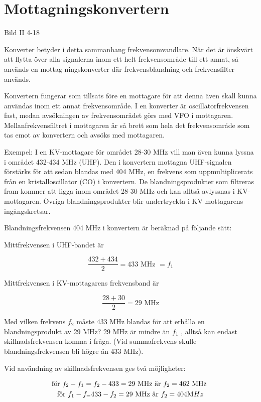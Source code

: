 \section{Mottagningskonvertern}

Bild II 4-18

Konverter betyder i detta sammanhang frekvensomvandlare. När det är
önskvärt att flytta över alla signalerna inom ett helt frekvensområde
till ett annat, så används en mottag ningskonverter där
frekvensblandning och frekvensfilter används.

Konvertern fungerar som tillsats före en mottagare för att denna även
skall kunna användas inom ett annat frekvensområde. I en konverter är
oscillatorfrekvensen fast, medan avsökningen av frekvensområdet görs
med VFO i mottagaren. Mellanfrekvensfiltret i mottagaren är så brett
som hela det frekvensområde som tas emot av konvertern och avsöks med
mottagaren.

Exempel: I en KV-mottagare för området 28-30 MHz vill man även kunna
lyssna i området 432-434 MHz (UHF). Den i konvertern mottagna
UHF-signalen förstärks för att sedan blandas med 404 MHz, en frekvens
som uppmultiplicerats från en kristalloscillator (CO) i konvertern. De
blandningsprodukter som filtreras fram kommer att ligga inom området
28-30 MHz och kan alltså avlyssnas i KV-mottagaren. Övriga
blandningsprodukter blir undertryckta i KV-mottagarens ingångskretsar.

Blandningsfrekvensen 404 MHz i konvertern är beräknad på följande sätt:

Mittfrekvensen i UHF-bandet är

\[\frac{432+434}{2} = 433\text{ MHz } = f_1\]

Mittfrekvensen i KV-mottagarens frekvensband är

\[\frac{28 + 30}{2} = 29\text{ MHz}\]

Med vilken frekvens \(f_2\) måste 433 MHz blandas för att erhålla en
blandningsprodukt av 29 MHz? 29 MHz är mindre än \(f_1\) , alltså kan
endast skillnadsfrekvensen komma i fråga. (Vid summafrekvens skulle
blandningsfrekvensen bli högre än 433 MHz).

Vid användning av skillnadsfrekvensen ges två möjligheter:

\begin{gather*}
  \text{för }f_2 - f_1 = f_2 - 433 = 29\text{ MHz är }f_2 = 462\text{ MHz} \\
  \text{för }f_1 - f_ = 433 - f_2 = 29\text{ MHz är }f_2 = 404{\text MHz} \\
\end{gather*}

